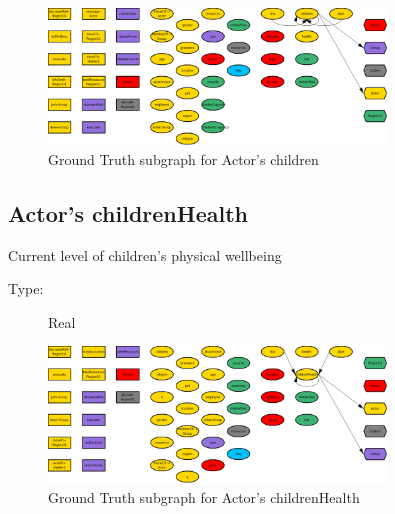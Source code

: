 \documentclass{article}%
\begin{document}
\begin{figure}[ht]%
\centering%
\includegraphics[width=0.8\textwidth]{images/childrenOfActor.png}%
\caption{Ground Truth subgraph for Actor's children}%
\end{figure}

%
\subsection{Actor's childrenHealth}%
\label{subsec:Actor's childrenHealth}%
Current level of children's physical wellbeing%
\begin{description}%
\item[Type:]%
Real%
\end{description}%


\begin{figure}[ht]%
\centering%
\includegraphics[width=0.8\textwidth]{images/childrenHealthOfActor.png}%
\caption{Ground Truth subgraph for Actor's childrenHealth}%
\end{figure}

%
\end{document}
